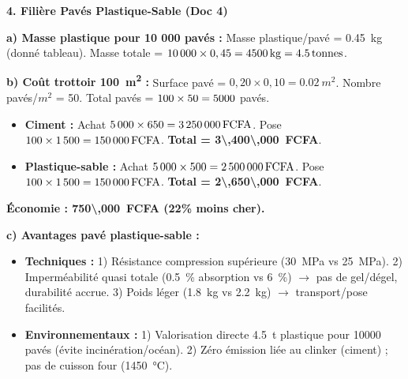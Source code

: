 \documentclass[11pt]{article}
\begin{document}
\begin{exoresolu}
\medskip
\noindent \textbf{4. Filière Pavés Plastique-Sable (Doc 4)}
\par
\textbf{a) Masse plastique pour 10 000 pavés :}
Masse plastique/pavé = \SI{0,45}{kg} (donné tableau).
Masse totale = $10\,000 \times 0,45 = \mathbf{\SI{4\,500}{kg} = \SI{4,5}{tonnes}}$.
\par
\textbf{b) Coût trottoir \SI{100}{m^2} :}
Surface pavé = $0,20 \times 0,10 = \SI{0,02}{m^2}$. Nombre pavés/$m^2$ = 50.
Total pavés = $100 \times 50 = \num{5\,000}$ pavés.
\begin{itemize}
    \item \textbf{Ciment :} Achat $5\,000 \times 650 = \SI{3\,250\,000}{FCFA}$. Pose $100 \times 1\,500 = \SI{150\,000}{FCFA}$. \textbf{Total = \SI{3\,400\,000}{FCFA}}.
    \item \textbf{Plastique-sable :} Achat $5\,000 \times 500 = \SI{2\,500\,000}{FCFA}$. Pose $100 \times 1\,500 = \SI{150\,000}{FCFA}$. \textbf{Total = \SI{2\,650\,000}{FCFA}}.
\end{itemize}
\textbf{Économie : \SI{750\,000}{FCFA} (\num{22}\% moins cher).}
\par
\textbf{c) Avantages pavé plastique-sable :}
\begin{itemize}
    \item \textbf{Techniques :} 1) Résistance compression supérieure (\SI{30}{MPa} vs \SI{25}{MPa}). 2) Imperméabilité quasi totale (\SI{0,5}{\%} absorption vs \SI{6}{\%}) $\to$ pas de gel/dégel, durabilité accrue. 3) Poids léger (\SI{1,8}{kg} vs \SI{2,2}{kg}) $\to$ transport/pose facilités.
    \item \textbf{Environnementaux :} 1) Valorisation directe \SI{4,5}{t} plastique pour \num{10 000} pavés (évite incinération/océan). 2) Zéro émission  liée au clinker (ciment) ; pas de cuisson four (\SI{1450}{\celsius}).
\end{itemize}


\end{exoresolu}
\end{document}
